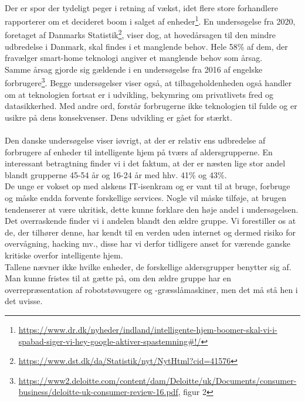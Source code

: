 \documentclass{article}
\begin{document}
\paragraph{}
Der er spor der tydeligt peger i retning af vækst, idet flere store forhandlere rapporterer om et decideret boom i salget af enheder\footnote{\url{https://www.dr.dk/nyheder/indland/intelligente-hjem-boomer-skal-vi-i-spabad-siger-vi-hey-google-aktiver-spastemning\#!/}}.
En undersøgelse fra 2020, foretaget af Danmarks Statistik\footnote{\url{https://www.dst.dk/da/Statistik/nyt/NytHtml?cid=41576}}, viser dog, at hovedårsagen til den mindre udbredelse i Danmark, skal findes i et manglende behov. Hele 58\% af dem, der fravælger smart-home teknologi angiver et manglende behov som årsag. \\
Samme årsag gjorde sig gældende i en undersøgelse fra 2016 af engelske forbrugere\footnote{\url{https://www2.deloitte.com/content/dam/Deloitte/uk/Documents/consumer-business/deloitte-uk-consumer-review-16.pdf}, figur 2}. Begge undersøgelser viser også, at tilbageholdenheden også handler om at teknologien fortsat er i udvikling, bekymring om privatlivets fred og datasikkerhed. Med andre ord, forstår forbrugerne ikke teknologien til fulde og er usikre på dens konsekvenser. Dens udvikling er gået for stærkt.\\
\paragraph{}
Den danske undersøgelse viser iøvrigt, at der er relativ ens udbredelse af forbrugere af enheder til intelligente hjem på tværs af aldersgrupperne. En interessant betragtning finder vi i det faktum, at der er næsten lige stor andel blandt grupperne 45-54 år og 16-24 år med hhv. 41\% og 43\%. \\
De unge er vokset op med alskens IT-isenkram og er vant til at bruge, forbruge og måske endda forvente forskellige services. Nogle vil måske tilføje, at brugen tendenserer at være ukritisk, dette kunne forklare den høje andel i undersøgelsen.\\
Det overraskende finder vi i andelen blandt den ældre gruppe. Vi forestiller os at de, der tilhører denne, har kendt til en verden uden internet og dermed risiko for overvågning, hacking mv., disse har vi derfor tidligere anset for værende ganske kritiske overfor intelligente hjem. \\
Tallene nævner ikke hvilke enheder, de forskellige aldersgrupper benytter sig af. Man kunne fristes til at gætte på, om den ældre gruppe har en overrepræsentation af robotstøvsugere og -græsslåmaskiner, men det må stå hen i det uvisse.
\end{document}
